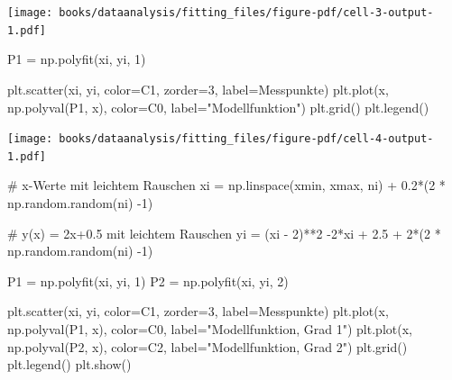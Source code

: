 \documentclass[
  letterpaper,
  DIV=11,
  numbers=noendperiod]{scrreprt}
\newenvironment{Shaded}{\begin{snugshade}}{\end{snugshade}}
\newcommand{\CommentTok}[1]{\textcolor[rgb]{0.37,0.37,0.37}{#1}}
\newcommand{\DecValTok}[1]{\textcolor[rgb]{0.68,0.00,0.00}{#1}}
\newcommand{\FloatTok}[1]{\textcolor[rgb]{0.68,0.00,0.00}{#1}}
\newcommand{\NormalTok}[1]{\textcolor[rgb]{0.00,0.23,0.31}{#1}}
\newcommand{\OperatorTok}[1]{\textcolor[rgb]{0.37,0.37,0.37}{#1}}
\newcommand{\StringTok}[1]{\textcolor[rgb]{0.13,0.47,0.30}{#1}}
\begin{document}
\texttt{[image: books/dataanalysis/fitting\_files/figure-pdf/cell-3-output-1.pdf]}

\begin{Shaded}
\begin{Highlighting}[]
\NormalTok{P1 }\OperatorTok{=}\NormalTok{ np.polyfit(xi, yi, }\DecValTok{1}\NormalTok{)}

\NormalTok{plt.scatter(xi, yi, color}\OperatorTok{=}\StringTok{\textquotesingle{}C1\textquotesingle{}}\NormalTok{, zorder}\OperatorTok{=}\DecValTok{3}\NormalTok{, label}\OperatorTok{=}\StringTok{\textquotesingle{}Messpunkte\textquotesingle{}}\NormalTok{)}
\NormalTok{plt.plot(x, np.polyval(P1, x), color}\OperatorTok{=}\StringTok{\textquotesingle{}C0\textquotesingle{}}\NormalTok{, label}\OperatorTok{=}\StringTok{"Modellfunktion"}\NormalTok{)}
\NormalTok{plt.grid()}
\NormalTok{plt.legend()}
\end{Highlighting}
\end{Shaded}

\texttt{[image: books/dataanalysis/fitting\_files/figure-pdf/cell-4-output-1.pdf]}

\begin{Shaded}
\begin{Highlighting}[]
\CommentTok{\# x{-}Werte mit leichtem Rauschen}
\NormalTok{xi }\OperatorTok{=}\NormalTok{ np.linspace(xmin, xmax, ni) }\OperatorTok{+} \FloatTok{0.2}\OperatorTok{*}\NormalTok{(}\DecValTok{2} \OperatorTok{*}\NormalTok{ np.random.random(ni) }\OperatorTok{{-}}\DecValTok{1}\NormalTok{)}

\CommentTok{\# y(x) = 2x+0.5 mit leichtem Rauschen}
\NormalTok{yi }\OperatorTok{=}\NormalTok{ (xi }\OperatorTok{{-}} \DecValTok{2}\NormalTok{)}\OperatorTok{**}\DecValTok{2} \OperatorTok{{-}}\DecValTok{2}\OperatorTok{*}\NormalTok{xi }\OperatorTok{+} \FloatTok{2.5} \OperatorTok{+} \DecValTok{2}\OperatorTok{*}\NormalTok{(}\DecValTok{2} \OperatorTok{*}\NormalTok{ np.random.random(ni) }\OperatorTok{{-}}\DecValTok{1}\NormalTok{)}
\end{Highlighting}
\end{Shaded}

\begin{Shaded}
\begin{Highlighting}[]
\NormalTok{P1 }\OperatorTok{=}\NormalTok{ np.polyfit(xi, yi, }\DecValTok{1}\NormalTok{)}
\NormalTok{P2 }\OperatorTok{=}\NormalTok{ np.polyfit(xi, yi, }\DecValTok{2}\NormalTok{)}

\NormalTok{plt.scatter(xi, yi, color}\OperatorTok{=}\StringTok{\textquotesingle{}C1\textquotesingle{}}\NormalTok{, zorder}\OperatorTok{=}\DecValTok{3}\NormalTok{, label}\OperatorTok{=}\StringTok{\textquotesingle{}Messpunkte\textquotesingle{}}\NormalTok{)}
\NormalTok{plt.plot(x, np.polyval(P1, x), color}\OperatorTok{=}\StringTok{\textquotesingle{}C0\textquotesingle{}}\NormalTok{, label}\OperatorTok{=}\StringTok{"Modellfunktion, Grad 1"}\NormalTok{)}
\NormalTok{plt.plot(x, np.polyval(P2, x), color}\OperatorTok{=}\StringTok{\textquotesingle{}C2\textquotesingle{}}\NormalTok{, label}\OperatorTok{=}\StringTok{"Modellfunktion, Grad 2"}\NormalTok{)}
\NormalTok{plt.grid()}
\NormalTok{plt.legend()}
\NormalTok{plt.show()}
\end{Highlighting}
\end{Shaded}
\end{document}
